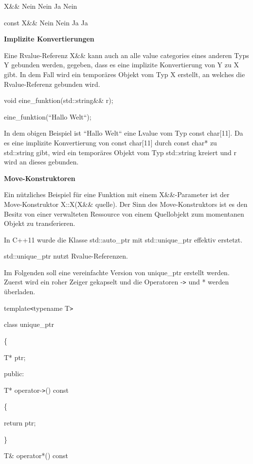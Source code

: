 \documentclass{article}
\begin{document}
X\&\&         Nein      Nein           Ja       Nein

const X\&\&   Nein      Nein           Ja       Ja

\vspace{12pt}
\textbf{Implizite Konvertierungen}

Eine Rvalue-Referenz X\&\& kann auch an alle value categories eines anderen Typs 
Y gebunden werden, gegeben, dass es eine implizite Konvertierung von Y zu X gibt. 
In dem Fall wird ein temporäres Objekt vom Typ X erstellt, an welches die Rvalue-Referenz 
gebunden wird.

void eine\_funktion(std::string\&\& r);

eine\_funktion(``Hallo Welt``);

In dem obigen Beispiel ist ``Hallo Welt`` eine Lvalue vom Typ const char[11]. Da 
es eine implizite Konvertierung von const char[11] durch const char* zu std::string 
gibt, wird ein temporäres Objekt vom Typ std::string kreiert und r wird an dieses 
gebunden.

\vspace{12pt}
\textbf{Move-Konstruktoren}

Ein nützliches Beispiel für eine Funktion mit einem X\&\&-Parameter ist der Move-Konstruktor 
X::X(X\&\& quelle). Der Sinn des Move-Konstruktors ist es den Besitz von einer 
verwalteten Ressource von einem Quellobjekt zum momentanen Objekt zu transferieren.

In C++11 wurde die Klasse std::auto\_ptr mit std::unique\_ptr effektiv erstetzt.

std::unique\_ptr nutzt Rvalue-Referenzen.

Im Folgenden soll eine vereinfachte Version von unique\_ptr erstellt werden. Zuerst 
wird ein roher Zeiger gekapselt und die Operatoren -\texttt{>} und * werden überladen.

template\texttt{<}typename T\texttt{>}

class unique\_ptr

\{    

\parindent=14pt
T* ptr;

\vspace{12pt}
\parindent=0pt
public:    

\parindent=14pt
T* operator-\texttt{>}() const    

\{        

\parindent=43pt
return ptr;    

\parindent=14pt
\}    

\vspace{12pt}
T\& operator*() const    
\end{document}
